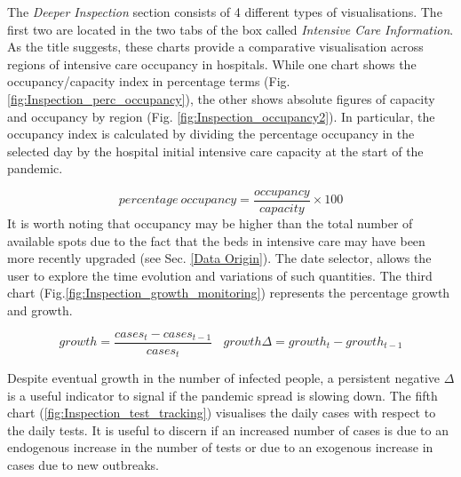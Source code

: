 \documentclass[
12pt, %
a4paper, %
oneside, %
headinclude,footinclude, %
BCOR5mm, %
]{scrartcl}
\begin{document}
The \textit{Deeper Inspection } section consists of 4 different types of visualisations. The first two are located in the two tabs of the box called \textit{Intensive Care Information}. As the title suggests, these charts provide a comparative visualisation across regions of intensive care occupancy in hospitals. While one chart shows the occupancy/capacity index in percentage terms (Fig. \ref{fig:Inspection_perc_occupancy}), the other shows absolute figures of capacity and occupancy by region (Fig. \ref{fig:Inspection_occupancy2}). In particular, the occupancy index is calculated by dividing the percentage occupancy in the selected day by the hospital initial intensive care capacity at the start of the pandemic.

\begin{equation}
percentage~occupancy = \dfrac{occupancy}{capacity} \times 100
\end{equation}
It is worth noting that occupancy may be higher than the total number of available spots due to the fact that the beds in intensive care may have been more recently upgraded (see Sec. \ref{Data Origin}). The date selector, allows the user to explore the time evolution and variations of such quantities. The third chart (Fig.\ref{fig:Inspection_growth_monitoring})  represents the percentage growth and growth.


\begin{equation}
growth = \frac{cases_t - cases_{t-1}}{cases_t} ~~~~ growth \Delta = growth_t - growth_{t-1}
\end{equation}

Despite eventual growth in the number of infected people, a persistent negative $\Delta$ is a useful indicator to signal if the pandemic spread is slowing down. The fifth chart (\ref{fig:Inspection_test_tracking}) visualises the daily cases with respect to the daily tests. It is useful to discern if an increased number of cases is due to an endogenous increase in the number of tests or due to an exogenous increase in cases due to new outbreaks.
\end{document}
